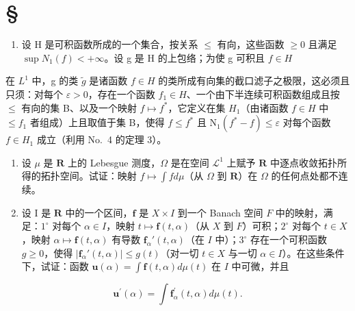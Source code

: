 \section*{\texorpdfstring{\S\CurrentExerciseGroup}{第{\CurrentExerciseGroup}节}}
{}

\begin{enumerate}
\def\labelenumi{\arabic{enumi})}
\tightlist
\item
  设 H 是可积函数所成的一个集合，按关系 \(\leqslant\) 有向，这些函数 \(\geqslant 0\) 且满足 \(\sup N_{1}(f) < +\infty\)。设 g 是 H 的上包络；为使 g 可积且 \(f \in H\)
\end{enumerate}

在 \(L^{1}\) 中，g 的类 \(\widetilde{g}\) 是诸函数 \(f \in H\) 的类所成有向集的截口滤子之极限，这必须且只须：对每个 \(\varepsilon > 0\)，存在一个函数 \(f_{1} \in H\)、一个由下半连续可积函数组成且按 \(\leqslant\) 有向的集 B、以及一个映射 \(f \mapsto f^{*}\)，它定义在集 \(H_{1}\)（由诸函数 \(f \in H\) 中 \(\leqslant f_{1}\) 者组成）上且取值于集 B，使得 \(f \leqslant f^{*}\) 且 \(\mathrm{N}_{1}(f^{*} - f) \leqslant \varepsilon\) 对每个函数 \(f \in H_{1}\) 成立（利用 No.~4 的定理 3）。

\begin{enumerate}
\def\labelenumi{\arabic{enumi})}
\setcounter{enumi}{1}
\item
  设 \(\mu\) 是 \(\mathbf{R}\) 上的 Lebesgue 测度，\(\Omega\) 是在空间 \(\mathcal{L}^1\) 上赋予 \(\mathbf{R}\) 中逐点收敛拓扑所得的拓扑空间。试证：映射 \(f\mapsto \int fd\mu\)（从 \(\Omega\) 到 \(\mathbf{R}\)）在 \(\Omega\) 的任何点处都不连续。
\item
  设 I 是 \(\mathbf{R}\) 中的一个区间，\(\mathbf{f}\) 是 \(X \times I\) 到一个 Banach 空间 \(F\) 中的映射，满足：\(1^{\circ}\) 对每个 \(\alpha \in I\)，映射 \(t \mapsto \mathbf{f}(t, \alpha)\)（从 \(X\) 到 \(F\)）可积；\(2^{\circ}\) 对每个 \(t \in X\)，映射 \(\alpha \mapsto \mathbf{f}(t, \alpha)\) 有导数 \(\mathbf{f}_{\alpha}'(t, \alpha)\)（在 \(I\) 中）；\(3^{\circ}\) 存在一个可积函数 \(g \geqslant 0\)，使得 \(|\mathbf{f}_{\alpha}'(t, \alpha)| \leqslant g(t)\)（对一切 \(t \in X\) 与一切 \(\alpha \in I\)）。在这些条件下，试证：函数 \(\mathbf{u}(\alpha) = \int \mathbf{f}(t, \alpha) d\mu(t)\) 在 \(I\) 中可微，并且
\end{enumerate}

\[
\mathbf {u} ^ {\prime} (\alpha) = \int \mathbf {f} _ {\alpha} ^ {\prime} (t, \alpha) d \mu (t).
\]

